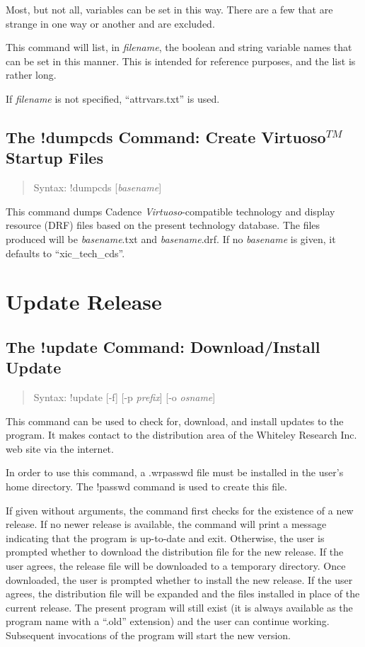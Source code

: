 Most, but not all, variables can be set in this way.  There are a few
that are strange in one way or another and are excluded.

This command will list, in {\it filename\/}, the boolean and string
variable names that can be set in this manner.  This is intended for
reference purposes, and the list is rather long.

If {\it filename} is not specified, ``{\vt attrvars.txt}'' is used.

\subsection{The {\cb !dumpcds} Command: Create Virtuoso$^{TM}$ Startup Files}
\begin{quote}
Syntax: {\vt !dumpcds} [{\it basename\/}]
\end{quote}
This command dumps Cadence {\it Virtuoso\/}-compatible technology and
display resource (DRF) files based on the present {\Xic} technology
database.  The files produced will be {\it basename\/}{\vt .txt} and
{\it basename\/}{\vt .drf}.  If no {\it basename} is given, it
defaults to ``{\vt xic\_tech\_cds}''.


\section{Update Release}

\subsection{The {\cb !update} Command: Download/Install Update}
\begin{quote}
Syntax: {\vt !update} [{\vt -f}] [{\vt -p} {\it prefix\/}]
  [{\vt -o} {\it osname\/}]
\end{quote}
This command can be used to check for, download, and install updates
to the program.  It makes contact to the distribution area of the
Whiteley Research Inc.  web site via the internet.

In order to use this command, a {\vt .wrpasswd} file must be installed
in the user's home directory.  The {\cb !passwd} command is used to
create this file.

If given without arguments, the command first checks for the existence
of a new release.  If no newer release is available, the command will
print a message indicating that the program is up-to-date and exit. 
Otherwise, the user is prompted whether to download the distribution
file for the new release.  If the user agrees, the release file will
be downloaded to a temporary directory.  Once downloaded, the user is
prompted whether to install the new release.  If the user agrees, the
distribution file will be expanded and the files installed in place of
the current release.  The present program will still exist (it is
always available as the program name with a ``{\vt .old}'' extension)
and the user can continue working.  Subsequent invocations of the
program will start the new version.

